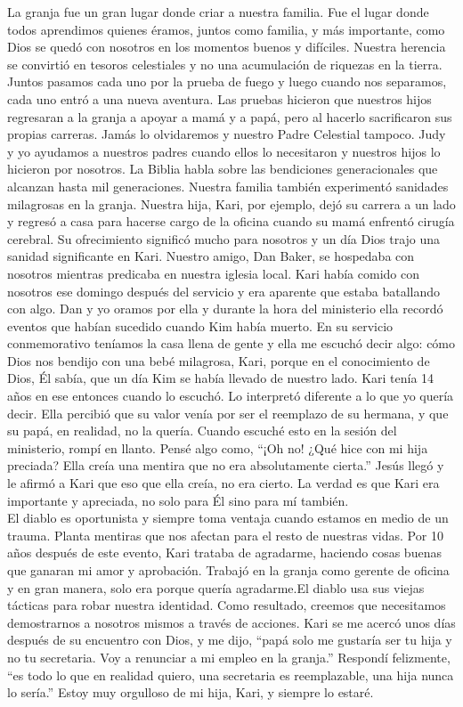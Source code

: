 \documentclass[twoside, 12pt]{book}
\begin{document}
La granja fue un gran lugar donde criar a nuestra familia. Fue el lugar donde todos aprendimos quienes éramos, juntos como familia, y más importante, como Dios se quedó con nosotros en los momentos buenos y difíciles. Nuestra herencia se convirtió en tesoros celestiales y no  una acumulación de riquezas en la tierra. Juntos pasamos cada uno por la prueba de fuego y luego cuando nos separamos, cada uno entró a una nueva aventura. Las pruebas hicieron que nuestros hijos regresaran a la granja a apoyar a mamá y a papá, pero al hacerlo sacrificaron sus propias carreras. Jamás lo olvidaremos y nuestro Padre Celestial tampoco. Judy y yo ayudamos a nuestros padres cuando ellos lo necesitaron y nuestros hijos lo hicieron por nosotros. La Biblia habla sobre las bendiciones generacionales que alcanzan hasta mil generaciones.
Nuestra familia también experimentó sanidades milagrosas en la granja. Nuestra hija, Kari, por ejemplo, dejó su carrera a un lado y regresó a casa para hacerse cargo de la oficina cuando su mamá enfrentó cirugía cerebral. Su ofrecimiento significó mucho para nosotros y un día Dios trajo una sanidad significante en Kari. Nuestro amigo, Dan Baker, se hospedaba con nosotros mientras predicaba en nuestra iglesia local. Kari había comido con nosotros ese domingo después del servicio y era aparente que estaba batallando con algo. Dan y yo oramos por ella y durante la hora del ministerio ella recordó eventos que habían sucedido cuando Kim había muerto. En su servicio conmemorativo teníamos la casa llena de gente y ella me escuchó decir algo: cómo Dios nos bendijo con una bebé milagrosa, Kari, porque en el conocimiento de Dios, Él sabía, que un día Kim se había llevado de nuestro lado. Kari tenía 14 años en ese entonces cuando lo escuchó. Lo interpretó diferente a lo que yo quería decir. Ella percibió que su valor venía por ser el reemplazo de su hermana, y que su papá, en realidad, no la quería. Cuando escuché esto en la sesión del ministerio, rompí en llanto. Pensé algo como, “¡Oh no! ¿Qué hice con mi hija preciada? Ella creía una mentira que no era absolutamente cierta.” Jesús llegó y le afirmó a Kari que eso que ella creía, no era cierto.  La verdad es que Kari era importante y apreciada, no solo para Él sino para mí también.\\

El diablo es oportunista y siempre toma ventaja cuando estamos en medio de un trauma. Planta mentiras que nos afectan para el resto de nuestras vidas. Por 10 años después de este evento, Kari trataba de agradarme, haciendo cosas buenas que ganaran mi amor y aprobación. Trabajó en la granja como gerente de oficina y en gran manera, solo era porque quería agradarme.El diablo usa sus viejas tácticas para robar nuestra identidad. Como resultado, creemos que necesitamos demostrarnos a nosotros mismos a través de acciones. Kari se me acercó unos días después de su encuentro con Dios, y me dijo, “papá solo me gustaría ser tu hija y no tu secretaria. Voy a renunciar a mi empleo en la granja.” Respondí felizmente, “es todo lo que en realidad quiero, una secretaria es reemplazable, una hija nunca lo sería.” Estoy muy orgulloso de mi hija, Kari, y siempre lo estaré.\\
\end{document}
